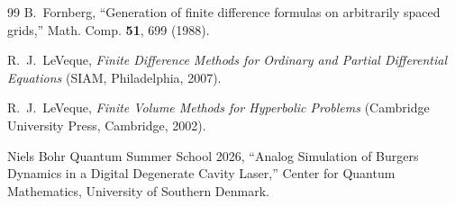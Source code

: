 \documentclass[aps,pra,twocolumn,notitlepage,superscriptaddress,floatfix,10pt]{revtex4-2}
\begin{document}
\begin{thebibliography}{99}
 B.~Fornberg, ``Generation of finite difference formulas on arbitrarily spaced
grids,'' Math. Comp. \textbf{51}, 699 (1988).

 R.~J.~LeVeque, \emph{Finite Difference Methods for Ordinary and Partial
Differential Equations} (SIAM, Philadelphia, 2007).

 R.~J.~LeVeque, \emph{Finite Volume Methods for Hyperbolic Problems} (Cambridge
University Press, Cambridge, 2002).

 Niels Bohr Quantum Summer School 2026, ``Analog Simulation of Burgers Dynamics in a
Digital Degenerate Cavity Laser,'' Center for Quantum Mathematics, University of Southern Denmark.

\end{thebibliography}
\end{document}
